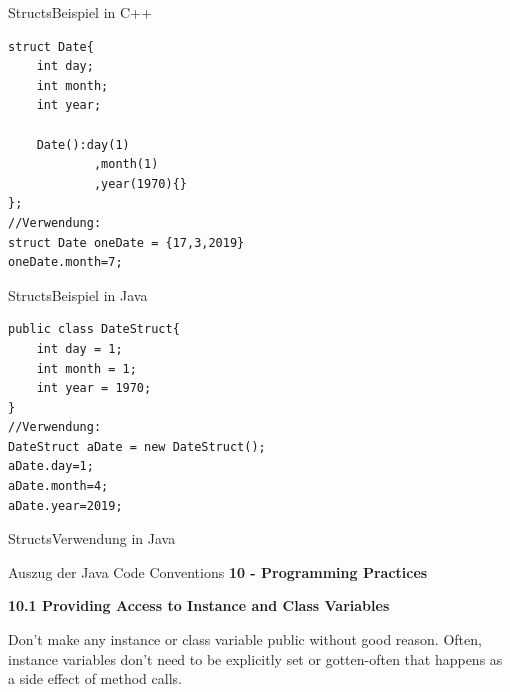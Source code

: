 \begin{frame}[fragile]{Structs}{Beispiel in C++}
\lstset{style=cpp}
\begin{lstlisting}
struct Date{
    int day;
    int month;
    int year;
    
    Date():day(1)
            ,month(1)
            ,year(1970){}
};
//Verwendung:
struct Date oneDate = {17,3,2019}
oneDate.month=7;
\end{lstlisting}
\end{frame}

\begin{frame}[fragile]{Structs}{Beispiel in Java}
\lstset{style=javacode}
\begin{lstlisting}
public class DateStruct{
    int day = 1;
    int month = 1;
    int year = 1970;
}
//Verwendung:
DateStruct aDate = new DateStruct();
aDate.day=1;
aDate.month=4;
aDate.year=2019;
\end{lstlisting}
\end{frame}

\begin{frame}{Structs}{Verwendung in Java}
    \begin{alertblock}{Auszug der Java Code Conventions}
    \textbf{10 - Programming Practices}
    
    \textbf{10.1 Providing Access to Instance and Class Variables}
    
    Don't make any instance or class variable public without good reason. Often, instance variables don't need to be explicitly set or gotten-often that happens as a side effect of method calls.
    
    \end{alertblock}
\end{frame}

